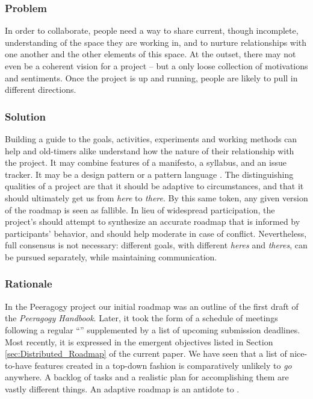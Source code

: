 \subsubsection*{Problem} In order to collaborate, people need a way to share current, though incomplete, understanding of the space they are working in, and to nurture relationships with one another and the other elements of this space.  At the outset, there may not even be a coherent vision for a project -- but a only loose collection of motivations and sentiments.  Once the project is up and running, people are likely to pull in different directions.   

\subsubsection*{Solution}  Building a guide to the goals, activities, experiments and working methods can help  and old-timers alike understand how the nature of their relationship with the project.  %
It may combine features of a manifesto, a syllabus, and an issue tracker.  It may be a design pattern or a pattern language \cite{kohls2010structure}.  The distinguishing qualities of a project  are that it should be adaptive to circumstances, and that it should ultimately get us from \emph{here} to \emph{there}.  By this same token, any given version of the roadmap is seen as fallible.  %
In lieu of widespread participation, the project's  should attempt to synthesize an accurate roadmap that is informed by participants' behavior, and should help moderate in case of conflict.  Nevertheless, full consensus is not necessary: different goals, with different \emph{heres} and \emph{theres}, can be pursued separately, while maintaining communication.

\subsubsection*{Rationale} 
In the Peeragogy project our initial roadmap was an outline of the
first draft of the \emph{Peeragogy Handbook}.  Later, it took the form
of a schedule of meetings following a regular
``'' supplemented by a list of upcoming
submission deadlines.  Most recently, it is expressed in the emergent
objectives listed in Section \ref{sec:Distributed_Roadmap} of the
current paper.  We have seen that a list of nice-to-have features created
in a top-down fashion is comparatively unlikely to \emph{go} anywhere.
A backlog of tasks and a realistic plan for accomplishing them are
vastly different things.  An adaptive roadmap is an
antidote to 
\cite[pp. 121--124]{david2001software}. 

